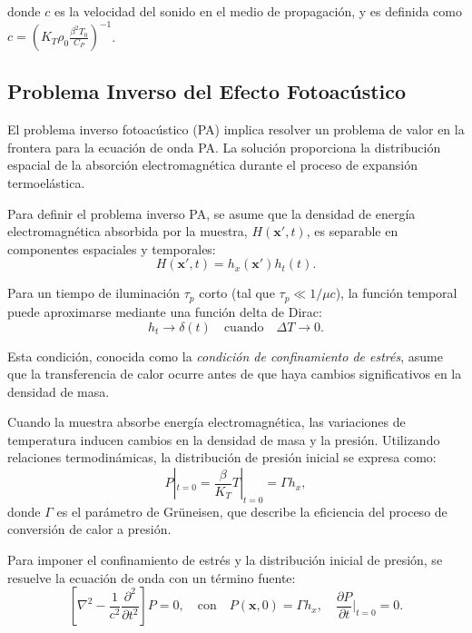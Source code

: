 donde $c$ es la velocidad del sonido en el medio de propagación, y es definida como $c = \left(K_{T}\rho_{0}\frac{\beta^2 T_{0}}{C_{P}}\right)^{-1}$.

\subsection{Problema Inverso del Efecto Fotoacústico}
El problema inverso fotoacústico (PA) implica resolver un problema de valor en la frontera para la ecuación de onda PA. La solución proporciona la distribución espacial de la absorción electromagnética durante el proceso de expansión termoelástica.

Para definir el problema inverso PA, se asume que la densidad de energía electromagnética absorbida por la muestra, $H(\mathbf{x}',t)$, es separable en componentes espaciales y temporales:
\begin{equation}
    H(\mathbf{x}',t) = h_x(\mathbf{x}') h_t(t).
\end{equation}

Para un tiempo de iluminación $\tau_p$ corto (tal que $\tau_p \ll 1/\mu c$), la función temporal puede aproximarse mediante una función delta de Dirac:
\begin{equation}
    h_t \to \delta(t) \quad \text{cuando} \quad \Delta T \to 0.
\end{equation}

Esta condición, conocida como la \textit{condición de confinamiento de estrés}, asume que la transferencia de calor ocurre antes de que haya cambios significativos en la densidad de masa.

Cuando la muestra absorbe energía electromagnética, las variaciones de temperatura inducen cambios en la densidad de masa y la presión. Utilizando relaciones termodinámicas, la distribución de presión inicial se expresa como:
\begin{equation}
    P|_{t=0} = \frac{\beta}{K_T} T|_{t=0} = \Gamma h_x,
\end{equation}
donde $\Gamma$ es el parámetro de Grüneisen, que describe la eficiencia del proceso de conversión de calor a presión.

Para imponer el confinamiento de estrés y la distribución inicial de presión, se resuelve la ecuación de onda con un término fuente:
\begin{equation}
    \left[ \nabla^2 - \frac{1}{c^2} \frac{\partial^2}{\partial t^2} \right] P = 0, \quad \text{con} \quad P(\mathbf{x}, 0) = \Gamma h_x, \quad \frac{\partial P}{\partial t} \Big|_{t=0} = 0.
\end{equation}

